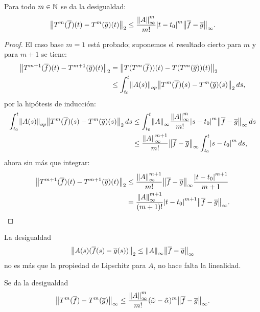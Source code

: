 \documentclass[../ecuaciones_diferenciales.tex]{subfiles}
\begin{document}
\begin{lemma} \label{lem:desinfty}
	Para todo \(m \in \mathbb{N}\) se da la desigualdad:
	\[\norm{T^m(\vec{f})(t) - T^m(\vec{g})(t)}_2 
		\leq \frac{\norm{A}^m_\infty}{m!} \abs{t - t_0}^m 
			\norm{\vec{f} - \vec{g}}_\infty.\]
\end{lemma}

\begin{proof}
	El caso base \(m = 1\) está probado; suponemos el resultado cierto para
	\(m\) y para \(m + 1\) se tiene:
	\begin{align*}
		\norm{T^{m + 1}(\vec{f})(t) - T^{m + 1}(\vec{g})(t)}_2
		 & = \norm{T(T^m(\vec{f}))(t) - T(T^m (\vec{g}))(t)}_2 \\
		 & \leq \int_{t_0}^t \norm{A(s)}_{op}
		\norm{T^m(\vec{f})(s) - T^m (\vec{g})(s)}_2 \dif s,
	\end{align*}
	por la hipótesis de inducción:
	\begin{align*}
		\int_{t_0}^t \norm{A(s)}_{op}
		\norm{T^m(\vec{f})(s) - T^m(\vec{g})(s)}_2 \dif s
		 & \leq \int_{t_0}^t \norm{A}_\infty
		\frac{\norm{A}^m_\infty}{m!} \abs{s - t_0}^m
		\norm{\vec{f} - \vec{g}}_\infty \dif s \\
		 & \leq \frac{\norm{A}^{m + 1}_\infty}{m!} 
		 \norm{\vec{f} - \vec{g}}_\infty \int_{t_0}^t \abs{s - t_0}^m \dif s,
	\end{align*}
	ahora sin más que integrar:
	\begin{align*}
		\norm{T^{m + 1}(\vec{f})(t) - T^{m + 1}(\vec{g})(t)}_2
		&\leq \frac{\norm{A}^{m + 1}_\infty}{m!} 
		 	\norm{\vec{f} - \vec{g}}_\infty \frac{\abs{t - t_0}^{m + 1}}{m + 1} 
		\\
		&= \frac{\norm{A}^{m + 1}_\infty}{(m + 1)!} \abs{t - t_0}^{m + 1}
		\norm{\vec{f} - \vec{g}}_\infty.
	\end{align*}
\end{proof}

\begin{remark}
	La desigualdad 
	\[\norm{A(s)(\vec{f}(s) - \vec{g}(s))}_2 
		\leq \norm{A}_\infty \norm{\vec{f} - \vec{g}}_\infty\] 
	no es más que la propiedad de Lipschitz para \(A\), 
	no hace falta la linealidad.
\end{remark}

\begin{corollary} \label{cor:T_norm_infty_ineq}
	Se da la desigualdad
	\[\norm{T^m(\vec{f}) - T^m(\vec{g})}_\infty 
		\leq \frac{\norm{A}^m_\infty}{m!} (\tilde{\omega} - \tilde{\alpha})^m
		\norm{\vec{f} - \vec{g}}_\infty.\]
\end{corollary}
\end{document}
